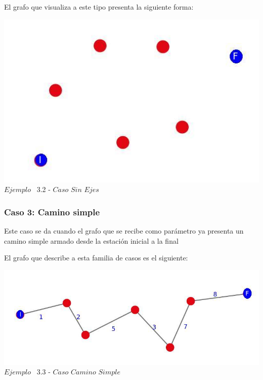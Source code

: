 El grafo que visualiza a este tipo presenta la siguiente forma:\\

\vspace*{0.3cm} \vspace*{0.3cm}
  \begin{center}
 \includegraphics[scale=0.5]{./EJ3/grafoSinEjes.jpeg}
 \\{$Ejemplo$ \ 3.2 - $Caso$ $Sin$ $Ejes$}
  \end{center}
  \vspace*{0.3cm}

\begin{center}
 \subsubsection*{Caso 3: Camino simple}
\end{center}

Este caso se da cuando el grafo que se recibe como par\'ametro ya presenta un camino simple armado desde la estaci\'on inicial a la final

El grafo que describe a esta familia de casos es el siguiente:\\

\vspace*{0.3cm} \vspace*{0.3cm}
  \begin{center}
 \includegraphics[scale=0.5]{./EJ3/grafoCaminoSimple.jpeg}
 \\{$Ejemplo$ \ 3.3 - $Caso$ $Camino$ $Simple$}
  \end{center}
  \vspace*{0.3cm}
  
